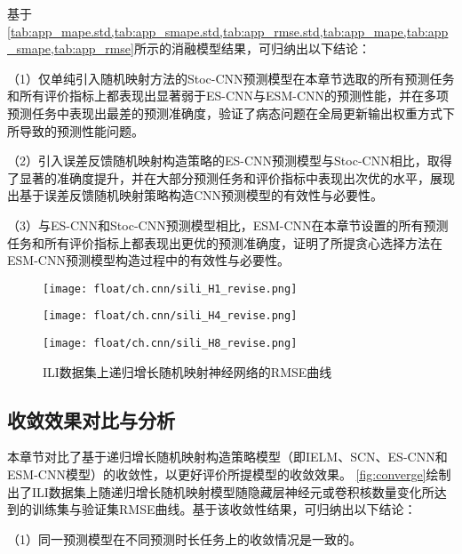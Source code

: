 基于\cref{tab:app_mape.std,tab:app_smape.std,tab:app_rmse.std,tab:app_mape,tab:app_smape,tab:app_rmse}所示的消融模型结果，可归纳出以下结论：

（1）仅单纯引入随机映射方法的Stoc-CNN预测模型在本章节选取的所有预测任务和所有评价指标上都表现出显著弱于ES-CNN与ESM-CNN的预测性能，并在多项预测任务中表现出最差的预测准确度，验证了病态问题在全局更新输出权重方式下所导致的预测性能问题。

（2）引入误差反馈随机映射构造策略的ES-CNN预测模型与Stoc-CNN相比，取得了显著的准确度提升，并在大部分预测任务和评价指标中表现出次优的水平，展现出基于误差反馈随机映射策略构造CNN预测模型的有效性与必要性。

（3）与ES-CNN和Stoc-CNN预测模型相比，ESM-CNN在本章节设置的所有预测任务和所有评价指标上都表现出更优的预测准确度，证明了所提贪心选择方法在ESM-CNN预测模型构造过程中的有效性与必要性。

\begin{figure*}[!t]
    \centering
    \begin{minipage}[b]{0.43\textwidth}
        \texttt{[image: float/ch.cnn/sili\_H1\_revise.png]}
    \end{minipage}
    \hspace{4em}
    \begin{minipage}[b]{0.43\textwidth}
        \texttt{[image: float/ch.cnn/sili\_H4\_revise.png]}
    \end{minipage}
    \begin{minipage}[b]{0.43\textwidth}
        \texttt{[image: float/ch.cnn/sili\_H8\_revise.png]}
    \end{minipage}

    \caption{\label{fig:converge} ILI数据集上递归增长随机映射神经网络的RMSE曲线}
\end{figure*}


\subsection{收敛效果对比与分析}
本章节对比了基于递归增长随机映射构造策略模型（即IELM、SCN、ES-CNN和ESM-CNN模型）的收敛性，以更好评价所提模型的收敛效果。
\autoref{fig:converge}绘制出了ILI数据集上随递归增长随机映射模型随隐藏层神经元或卷积核数量变化所达到的训练集与验证集RMSE曲线。基于该收敛性结果，可归纳出以下结论：

（1）同一预测模型在不同预测时长任务上的收敛情况是一致的。

